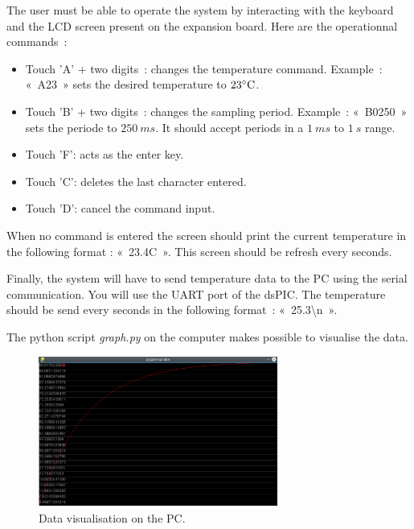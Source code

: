 \documentclass[11pt,a4paper]{article}
\theoremstyle{definition}%
\begin{document}
The user must be able to operate the system by interacting with the keyboard and the LCD screen present on the expansion board.
Here are the operationnal commands~:
\begin{itemize}
	\item Touch 'A' + two digits~: changes the temperature command.
	Example~: «~A23~» sets the desired temperature to $23\celsius$.
	\item Touch 'B' + two digits~: changes the sampling period.
	Example~: «~B0250~» sets the periode to $250\ ms$.
	It should accept periods in a $1\ ms$ to $1\ s$ range.
	\item Touch 'F': acts as the enter key. 
	\item Touch 'C': deletes the last character entered.
	\item Touch 'D': cancel the command input.
\end{itemize}

When no command is entered the screen should print the current temperature in the following format : «~23.4C~».
This screen should be refresh every seconds.

Finally, the system will have to send temperature data to the PC using the serial communication.
You will use the UART port of the dsPIC.
The temperature should be send every seconds in the following format~: «~25.3\textbackslash n~».

The python script \textit{graph.py} on the computer makes possible to visualise the data.
\begin{figure}[H]
\center
\includegraphics[width=0.7\textwidth]{graph}
\caption{Data visualisation on the PC.}
\label{fig:graphpy}
\end{figure}





\end{document}
